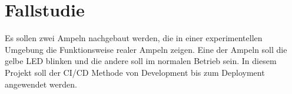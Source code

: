 \chapter{Fallstudie}

Es sollen zwei Ampeln nachgebaut werden, die  in einer experimentellen Umgebung die Funktionsweise realer Ampeln zeigen. Eine der Ampeln soll die gelbe LED blinken und die andere soll im normalen Betrieb sein. In diesem Projekt soll der CI/CD Methode von Development bis zum Deployment angewendet werden.











